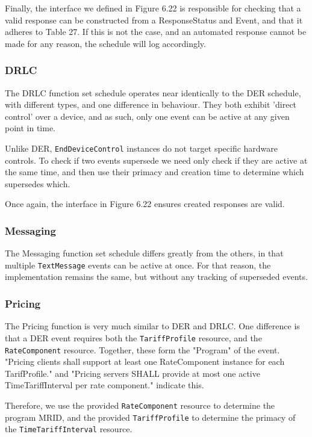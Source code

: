 Finally, the interface we defined in Figure 6.22 is responsible for checking that a valid response can be constructed from a ResponseStatus and Event, and that it adheres to Table 27. If this is not the case, and an automated response cannot be made for any reason, the schedule will log accordingly.

\subsubsection{DRLC}
The DRLC function set schedule operates near identically to the DER schedule, with different types, and one difference in behaviour. They both exhibit 'direct control' over a device, and as such, only one event can be active at any given point in time.

Unlike DER, \texttt{EndDeviceControl} instances do not target specific hardware controls. To check if two events supersede we need only check if they are active at the same time, and then use their primacy and creation time to determine which supersedes which.

Once again, the interface in Figure 6.22 ensures created responses are valid.

\subsubsection{Messaging}
The Messaging function set schedule differs greatly from the others, in that multiple \texttt{TextMessage} events can be active at once. For that reason, the implementation remains the same, but without any tracking of superseded events.

\subsubsection{Pricing}
The Pricing function is very much similar to DER and DRLC. One difference is that a DER event requires both the \texttt{TariffProfile} resource, and the \texttt{RateComponent} resource. Together, these form the "Program" of the event. "Pricing clients shall support at least one RateComponent instance for each TarifProfile." and "Pricing servers SHALL provide at most one active TimeTariffInterval per rate component." indicate this.

Therefore, we use the provided \texttt{RateComponent} resource to determine the program MRID, and the provided \texttt{TariffProfile} to determine the primacy of the \texttt{TimeTariffInterval} resource. 

